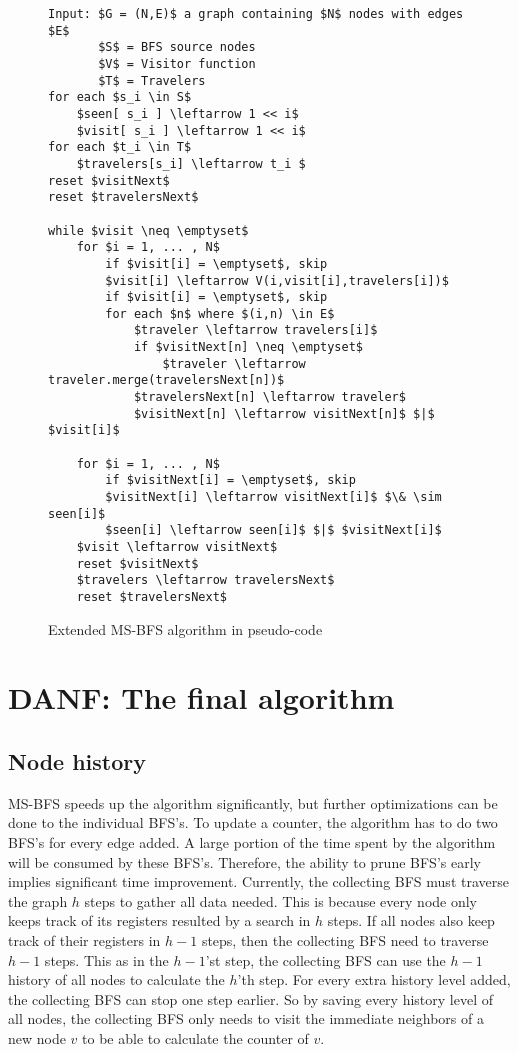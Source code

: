 \begin{figure}[h]
    \begin{lstlisting}[mathescape]
Input: $G = (N,E)$ a graph containing $N$ nodes with edges $E$
       $S$ = BFS source nodes
       $V$ = Visitor function
       $T$ = Travelers
for each $s_i \in S$
    $seen[ s_i ] \leftarrow 1 << i$
    $visit[ s_i ] \leftarrow 1 << i$
for each $t_i \in T$
    $travelers[s_i] \leftarrow t_i $
reset $visitNext$
reset $travelersNext$

while $visit \neq \emptyset$
    for $i = 1, ... , N$
        if $visit[i] = \emptyset$, skip
        $visit[i] \leftarrow V(i,visit[i],travelers[i])$
        if $visit[i] = \emptyset$, skip
        for each $n$ where $(i,n) \in E$
            $traveler \leftarrow travelers[i]$
            if $visitNext[n] \neq \emptyset$
                $traveler \leftarrow traveler.merge(travelersNext[n])$
            $travelersNext[n] \leftarrow traveler$
            $visitNext[n] \leftarrow visitNext[n]$ $|$ $visit[i]$

    for $i = 1, ... , N$
        if $visitNext[i] = \emptyset$, skip
        $visitNext[i] \leftarrow visitNext[i]$ $\& \sim seen[i]$
        $seen[i] \leftarrow seen[i]$ $|$ $visitNext[i]$
    $visit \leftarrow visitNext$
    reset $visitNext$
    $travelers \leftarrow travelersNext$
    reset $travelersNext$
    \end{lstlisting}
    \caption{Extended MS-BFS algorithm in pseudo-code}
    \label{fig:extended_ms-bfs_algorithm}
\end{figure}


\section{DANF: The final algorithm}
\subsection{Node history}

MS-BFS speeds up the algorithm significantly, but further optimizations can be done to the individual BFS's. To update a counter, the algorithm has to do two BFS's for every edge added. A large portion of the time spent by the algorithm will be consumed by these BFS's. Therefore, the ability to prune BFS's early implies significant time improvement. Currently, the collecting BFS must traverse the graph $h$ steps to gather all data needed. This is because every node only keeps track of its registers resulted by a search in $h$ steps. If all nodes also keep track of their registers in $h-1$ steps, then the collecting BFS need to traverse $h-1$ steps. This as in the $h-1$'st step, the collecting BFS can use the $h-1$ history of all nodes to calculate the $h$'th step. For every extra history level added, the collecting BFS can stop one step earlier. So by saving every history level of all nodes, the collecting BFS only needs to visit the immediate neighbors of a new node $v$ to be able to calculate the counter of $v$. 

